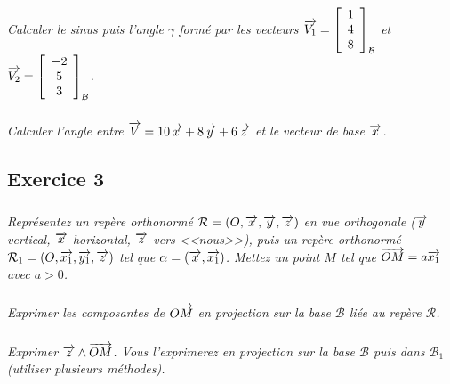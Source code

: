 \documentclass[11pt,oneside]{article}
\begin{document}
\subparagraph{}
\textit{Calculer le sinus puis l'angle $\gamma$ formé par les vecteurs $\overrightarrow{V_1}=\left[\begin{array}{c}1\\4\\8\end{array}\right]_{\mathcal{B}}$ et 
$\overrightarrow{V_2}=\left[\begin{array}{c}-2\\5\\3\end{array}\right]_{\mathcal{B}}$.}


\subparagraph{}
\textit{Calculer l'angle entre $\overrightarrow{V}=10\overrightarrow{x}+8\overrightarrow{y}+6\overrightarrow{z}$ et le vecteur de base $\overrightarrow{x}$.}


\subsection*{Exercice 3}
\setcounter{subparagraph}{0}

\subparagraph{}
\textit{Représentez un repère orthonormé $\mathcal{R}=\left(O,\overrightarrow{x},\overrightarrow{y},\overrightarrow{z} \right)$ en vue orthogonale ($\overrightarrow{y}$ vertical, $\overrightarrow{x}$ horizontal, $\overrightarrow{z}$ vers <<nous>>), puis un repère orthonormé $\mathcal{R}_1=\left(O,\overrightarrow{x_1},\overrightarrow{y_1},\overrightarrow{z} \right)$ tel que $\alpha=\left(\overrightarrow{x},\overrightarrow{x_1}\right)$. Mettez un point $M$ tel que $\overrightarrow{OM}=a\overrightarrow{x_1}$ avec $a>0$.}


\subparagraph{}
\textit{Exprimer les composantes de $\overrightarrow{OM}$ en projection sur la base $\mathcal{B}$ liée au repère $\mathcal{R}$.}



\subparagraph{}
\textit{Exprimer $\overrightarrow{z}\wedge\overrightarrow{OM}$. Vous l'exprimerez en projection sur la base $\mathcal{B}$ puis dans $\mathcal{B}_1$ (utiliser plusieurs méthodes).}
\end{document}
